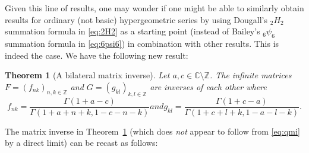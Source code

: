 \documentclass[reqno,12pt]{amsart}
\newtheorem{theorem}{Theorem}
\theoremstyle{remark}
\numberwithin{equation}{section}
\newcommand{\Ga}{\Gamma}
\newcommand{\Z}{\mathbb Z}
\newcommand{\C}{\mathbb C}
\begin{document}
Given this line of results, one may wonder if one might be able to
similarly obtain results for ordinary (not basic) hypergeometric
series by using Dougall's $_2H_2$ summation formula in \eqref{eq:2H2}
as a starting point (instead of Bailey's $_6\psi_6$ summation
formula in \eqref{eq:6psi6}) in combination with other results.
This is indeed the case.
We have the following new result:
\begin{theorem}[A bilateral matrix inverse]\label{thm:bmi}
  Let $a,c\in\C\setminus\Z$.
  The infinite matrices 
$F=(f_{nk})_{n,k\in\mathbb Z}$ and $G=(g_{kl})_{k,l\in\mathbb Z}$ are
inverses of each other where
\begin{subequations}
\begin{equation}\label{eq:bmfnk}
f_{nk}=\frac{\Ga(1+a-c)}
{\Ga(1+a+n+k,1-c-n-k)}
\end{equation}
and
\begin{equation}
g_{kl}=\frac{\Ga(1+c-a)}
{\Ga(1+c+l+k,1-a-l-k)}.
\end{equation}
\end{subequations}
\end{theorem}
The matrix inverse in Theorem~\ref{thm:bmi} (which does \textit{not}
appear to follow from \eqref{eq:qmi} by a direct limit)
can be recast as follows:
\end{document}
